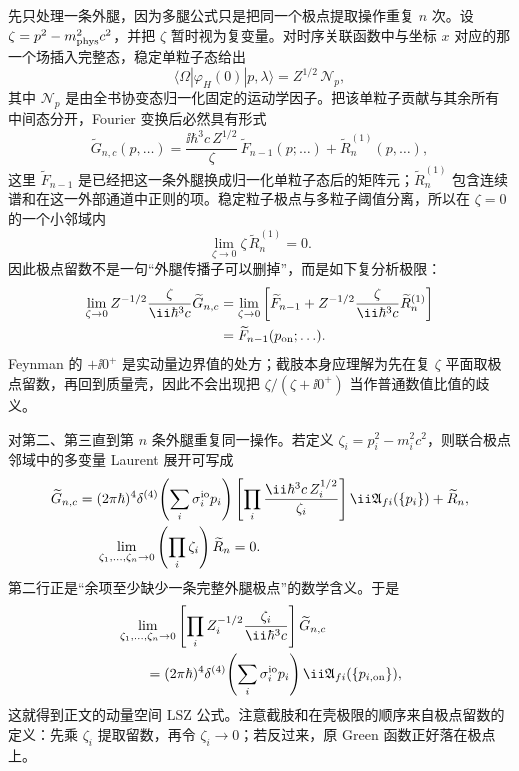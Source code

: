 \begin{derivation}[外腿极点怎样给出散射振幅]
先只处理一条外腿，因为多腿公式只是把同一个极点提取操作重复 $n$ 次。设 $\zeta=p^2-m_{\rm phys}^2c^2$，并把 $\zeta$ 暂时视为复变量。对时序关联函数中与坐标 $x$ 对应的那一个场插入完整态，稳定单粒子态给出
\begin{equation*}
 \langle\Omega|\varphi_H(0)|p,\lambda\rangle
 =Z^{1/2}\,\mathcal N_p,
\end{equation*}
其中 $\mathcal N_p$ 是由全书协变态归一化固定的运动学因子。把该单粒子贡献与其余所有中间态分开，Fourier 变换后必然具有形式
\begin{equation*}
 \widetilde G_{n,c}(p,\ldots)
 =\frac{\ii\hbar^3c\,Z^{1/2}}
 {\zeta}\,
 \widetilde F_{n-1}(p;\ldots)
 +\widetilde R^{(1)}_n(p,\ldots),
\end{equation*}
这里 $\widetilde F_{n-1}$ 是已经把这一条外腿换成归一化单粒子态后的矩阵元；$\widetilde R^{(1)}_n$ 包含连续谱和在这一外部通道中正则的项。稳定粒子极点与多粒子阈值分离，所以在 $\zeta=0$ 的一个小邻域内
\begin{equation*}
 \lim_{\zeta\to0}\zeta\,\widetilde R^{(1)}_n=0.
\end{equation*}
因此极点留数不是一句“外腿传播子可以删掉”，而是如下复分析极限：
\begin{align*}
 \lim_{\zeta\to0}
 Z^{-1/2}\frac{\zeta}{\ii\hbar^3c}
 \widetilde G_{n,c}
 &=\lim_{\zeta\to0}
 \left[
 \widetilde F_{n-1}
 +Z^{-1/2}\frac{\zeta}{\ii\hbar^3c}
 \widetilde R^{(1)}_n
 \right]\\
 &=\widetilde F_{n-1}(p_{\rm on};\ldots).
\end{align*}
Feynman 的 $+\ii0^+$ 是实动量边界值的处方；截肢本身应理解为先在复 $\zeta$ 平面取极点留数，再回到质量壳，因此不会出现把 $\zeta/(\zeta+\ii0^+)$ 当作普通数值比值的歧义。

对第二、第三直到第 $n$ 条外腿重复同一操作。若定义 $\zeta_i=p_i^2-m_i^2c^2$，则联合极点邻域中的多变量 Laurent 展开可写成
\begin{align*}
 \widetilde G_{n,c}
 ={}&(2\pi\hbar)^4\delta^{(4)}\!\left(\sum_i\sigma_i^{\rm io}p_i\right)
 \left[\prod_i
 \frac{\ii\hbar^3c\,Z_i^{1/2}}{\zeta_i}\right]
 \ii\mathfrak A_{fi}(\{p_i\})
 +\widetilde R_n,\\
 &\lim_{\zeta_1,\ldots,\zeta_n\to0}
 \left(\prod_i\zeta_i\right)\widetilde R_n=0.
\end{align*}
第二行正是“余项至少缺少一条完整外腿极点”的数学含义。于是
\begin{align*}
 &\lim_{\zeta_1,\ldots,\zeta_n\to0}
 \left[\prod_iZ_i^{-1/2}
 \frac{\zeta_i}{\ii\hbar^3c}\right]
 \widetilde G_{n,c}\\
 &\qquad=(2\pi\hbar)^4\delta^{(4)}\!\left(\sum_i\sigma_i^{\rm io}p_i\right)
 \ii\mathfrak A_{fi}(\{p_{i,\rm on}\}),
\end{align*}
这就得到正文的动量空间 LSZ 公式。注意截肢和在壳极限的顺序来自极点留数的定义：先乘 $\zeta_i$ 提取留数，再令 $\zeta_i\to0$；若反过来，原 Green 函数正好落在极点上。


\end{derivation}
